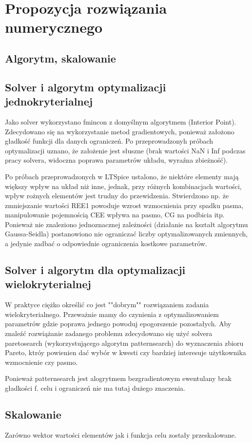 \documentclass{article}
\begin{document}
\section{Propozycja rozwiązania numerycznego}
\subsection{Algorytm, skalowanie}
\subsection*{Solver i algorytm optymalizacji jednokryterialnej}
Jako solver wykorzystano fmincon z domyślnym algorytmem (Interior Point). Zdecydowano się na wykorzystanie
metod gradientowych, ponieważ założono gładkość funkcji dla danych ograniczeń. Po przeprowadzonyh próbach optymalizacji uznano, że założenie jest słuszne (brak wartości
NaN i Inf podczas pracy solvera, widoczna poprawa parametrów układu, wyraźna zbieżność).

Po próbach przeprowadzonych w LTSpice ustalono, że niektóre elementy mają większy wpływ na układ niż inne, jednak, przy różnych kombinacjach wartości, wpływ rożnych elementów jest trudny do przewidzenia.
Stwierdzono np. że zmniejszanie wartości REE1 powoduje wzrost wzmocnienia przy spadku pasma, manipulowanie pojemnością CEE wpływa na pasmo, CG na podbicia itp.
Ponieważ nie znaleziono jednoznacznej zależności (działanie na kształt algorytmu Gaussa-Seidla) postanowiono nie ograniczać liczby optymalizowanych zmiennych, a jedynie zadbać o odpowiednie
ograniczenia kostkowe parametrów.
\subsection*{Solver i algorytm dla optymalizacji wielokryterialnej}
W praktyce ciężko określić co jest ""dobrym"" rozwiązaniem zadania wielokryterialnego. Przeważnie mamy do czynienia z optymalizowaniem parametrów gdzie poprawa jednego powoduj epogorszenie pozostałych.
Aby znaleźć rozwiążanie zadanego problemu zdecydowano się użyć solvera paretosearch (wykorzystującego algorytm patternsearch) do wyznaczenia zbioru Pareto, ktróy powienien dać wybór w kwesti czy bardziej interesuje użytkownika
wzmocnienie czy pasmo. 

Ponieważ patternsearch jest alogrytmem bezgradientowym ewentulany brak gładkości f. celu i ograniczeń nie ma tutaj dużego znaczenia.
\subsection*{Skalowanie}
Zarówno wektor wartości elementów jak i funkcja celu zostały przeskalowane.
\end{document}
